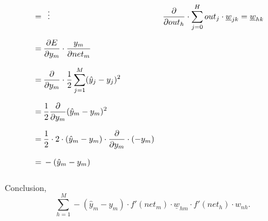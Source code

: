 \documentclass[12pt]{article}
\begin{document}
\begin{equation}
\begin{aligned}
        \:=\: & \mathrel{\makebox[\widthof{=}]{\vdots}}                                                              & \frac{\partial}{\partial out_{h}} \cdot \sum_{j=0}^{H} out_{j} \cdot \underline{w}_{jk} = \underline{w}_{hk}                                                                              \\[0.68em]
                                          \:=\: & \frac{\partial E}{\partial y_{m}} \cdot \frac{y_{m} }{\partial net_{m} }                             &                                                              &                                                                  \\[0.68em]
                                          \:=\: & \frac{\partial}{\partial y_{m}} \cdot \frac{1}{2} \sum_{j=1}^{M} (\hat{y}_{j} - y_{j})^{2}             &                                                              &                                                                  \\[0.68em]
                                          \:=\: & \frac{1}{2} \frac{\partial}{\partial y_{m}} (\hat{y}_{m} - y_{m})^{2}             &                                                              &                                                                  \\[0.68em]
                                          \:=\: & \frac{1}{2} \cdot 2 \cdot (\hat{y}_{m} - y_{m}) \cdot  \frac{\partial}{\partial y_{m}} \cdot (-y_{m} )            &                                                              &                                                                  \\[0.68em]
                                          \:=\: & -(\hat{y}_{m} - y_{m})            &                                                              &                                                                  \\[0.68em]
    \end{aligned}
\end{equation}

Conclusion, $$ \sum_{h=1}^{M} - (\hat{y}_{m} - y_{m}) \cdot f'(net_{m}) \cdot \underline{w}_{hm} \cdot f'(net_{h}) \cdot w_{nh}. $$
\end{document}
